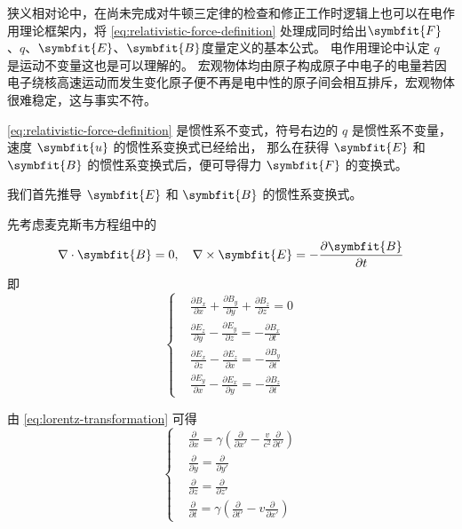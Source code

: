 狭义相对论中，在尚未完成对牛顿三定律的检查和修正工作时逻辑上也可以在电作用理论框架内，将 \cref{eq:relativistic-force-definition} 处理成同时给出$\symbfit{F}$、$q$、$\symbfit{E}$、$\symbfit{B}$度量定义的基本公式。
电作用理论中认定 $q$ 是运动不变量这也是可以理解的。
宏观物体均由原子构成原子中电子的电量若因电子绕核高速运动而发生变化原子便不再是电中性的原子间会相互排斥，宏观物体很难稳定，这与事实不符。

\cref{eq:relativistic-force-definition} 是惯性系不变式，符号右边的 $q$ 是惯性系不变量，速度 $\symbfit{u}$ 的惯性系变换式已经给出，
那么在获得 $\symbfit{E}$ 和 $\symbfit{B}$ 的惯性系变换式后，便可导得力 $\symbfit{F}$ 的变换式。

我们首先推导 $\symbfit{E}$ 和 $\symbfit{B}$ 的惯性系变换式。

先考虑麦克斯韦方程组中的
\begin{equation}
    \nabla \cdot \symbfit{B} = 0 , \quad \nabla \times \symbfit{E} = - \frac{\partial \symbfit{B}}{\partial t}
\end{equation}
即
\begin{equation}
    \left\{
    \begin{aligned}
         & \frac{\partial B_x}{\partial x} + \frac{\partial B_y}{\partial y} + \frac{\partial B_z}{\partial z} = 0 \\
         & \frac{\partial E_z}{\partial y} - \frac{\partial E_y}{\partial z} = - \frac{\partial B_x}{\partial t}   \\
         & \frac{\partial E_x}{\partial z} - \frac{\partial E_z}{\partial x} = - \frac{\partial B_y}{\partial t}   \\
         & \frac{\partial E_y}{\partial x} - \frac{\partial E_x}{\partial y} = - \frac{\partial B_z}{\partial t}
    \end{aligned}
    \right.
    \label{eq:maxwell-equations-1}
\end{equation}

由 \cref{eq:lorentz-transformation} 可得
\begin{equation}
    \left\{
    \begin{aligned}
         & \frac{\partial }{\partial x} = \gamma \left(\frac{\partial }{\partial x'} - \frac{v}{c^2} \frac{\partial }{\partial t'}\right) \\
         & \frac{\partial }{\partial y} = \frac{\partial }{\partial y'}                                                                   \\
         & \frac{\partial }{\partial z} = \frac{\partial }{\partial z'}                                                                   \\
         & \frac{\partial }{\partial t} = \gamma \left(\frac{\partial }{\partial t'} - v \frac{\partial }{\partial x'}\right)
    \end{aligned}
    \right.
\end{equation}


